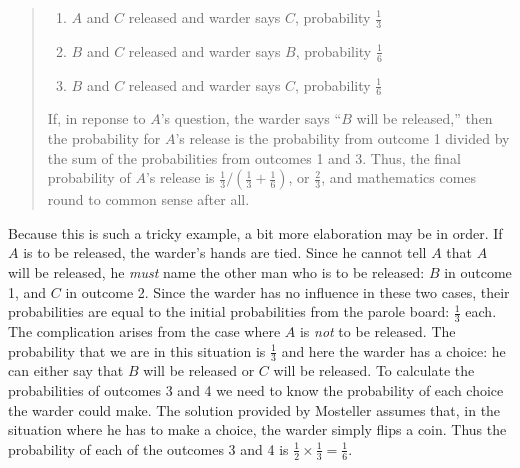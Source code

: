 \documentclass[addpoints,12pt]{exam}
\begin{document}
\begin{questions}
\begin{solution}
\begin{quote}
\begin{enumerate}
					\item $A$ and $C$ released and warder says $C$, probability $\frac{1}{3}$
					\item $B$ and $C$ released and warder says $B$, probability $\frac{1}{6}$
					\item $B$ and $C$ released and warder says $C$, probability $\frac{1}{6}$
				\end{enumerate}
		If, in reponse to $A$'s question, the warder says ``$B$ will be released,'' then the probability for $A$'s release is the probability from outcome 1 divided by the sum of the probabilities from outcomes 1 and 3. Thus, the final probability of $A$'s release is $\frac{1}{3}/\left(\frac{1}{3} + \frac{1}{6}\right)$, or $\frac{2}{3}$, and mathematics comes round to common sense after all.
			\end{quote}
	Because this is such a tricky example, a bit more elaboration may be in order. If $A$ is to be released, the warder's hands are tied. Since he cannot tell $A$ that $A$ will be released, he \emph{must} name the other man who is to be released: $B$ in outcome 1, and $C$ in outcome 2. Since the warder has no influence in these two cases, their probabilities are equal to the initial probabilities from the parole board: $\frac{1}{3}$ each. The complication arises from the case where $A$ is \emph{not} to be released. The probability that we are in this situation is $\frac{1}{3}$ and here the warder has a choice: he can either say that $B$ will be released or $C$ will be released. To calculate the probabilities of outcomes 3 and 4 we need to know the probability of each choice the warder could make. The solution provided by Mosteller assumes that, in the situation where he has to make a choice, the warder simply flips a coin. Thus the probability of each of the outcomes 3 and 4 is $\frac{1}{2} \times \frac{1}{3} = \frac{1}{6}$. 
	

\end{solution}
\end{questions}
\end{document}
